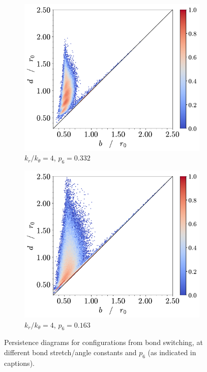 \begin{figure}[tbp]
        \begin{subfigure}[b]{0.40\textwidth}
         \centering
         \includegraphics[width=\textwidth]{./figures/ph/t_k4_189_bs_pd.pdf}
         \caption{$k_r/k_\theta=4$, $p_6=0.332$}%
         \label{fig:bspdg}
     \end{subfigure}
     \hspace{2cm}
      \begin{subfigure}[b]{0.40\textwidth}
         \centering
         \includegraphics[width=\textwidth]{./figures/ph/t_k4_0_bs_pd.pdf}
         \caption{$k_r/k_\theta=4$, $p_6=0.163$}%
         \label{fig:bspdh}
     \end{subfigure}
     
	\caption{Persistence diagrams for configurations from bond switching, at different bond stretch/angle constants and $p_6$ (as indicated in captions).}
	\label{fig:bspd}
\end{figure}

